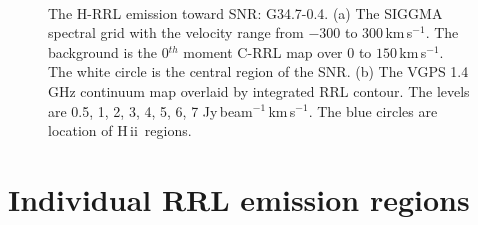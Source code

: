 \documentclass[manuscript]{aastex61}
\newcommand{\hii}{{\rm H\,}{{\sc ii}}}
\newcommand{\kms}{\,km\,s$^{-1}$}
\begin{document}
\begin{figure}[htbp]
\centering
{}
\\
\caption{The H-RRL emission toward SNR: G34.7-0.4.
          (a) The SIGGMA spectral grid with the velocity range from $-300$ to $300$\kms.
	  The background is the 0$^{th}$ moment C-RRL map over $0$ to $150$\kms.
	  The white circle is the central region of the SNR.
	  (b) The VGPS 1.4 GHz continuum map overlaid by integrated RRL contour.
	  The levels are 0.5, 1, 2, 3, 4, 5, 6, 7 Jy\,beam$^{-1}$\kms.
	  The blue circles are location of \hii\ regions.
	  }
\label{fig_snr-g347}
\end{figure}

\section{Individual RRL emission regions}\label{sec_indi}
\end{document}
